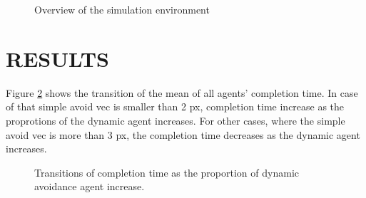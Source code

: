 \documentclass[letterpaper, 10 pt, conference]{ieeeconf}  %
\begin{document}
\begin{figure}[thpb]
   \centering
   \caption{Overview of the simulation environment}
   \label{fig:sim_env}
\end{figure}

\section{RESULTS} 
Figure \ref{fig:result_time} shows the transition of the mean of all agents' completion time. In case of that simple avoid vec is smaller than 2 px, completion time increase as the proprotions of the dynamic agent increases. For other cases, where the simple avoid vec is more than 3 px, the completion time decreases as the dynamic agent increases.

\begin{figure}[thpb]
   \centering
   \caption{Transitions of completion time as the proportion of dynamic avoidance agent increase.}
   \label{fig:result_time}
\end{figure}
\end{document}
